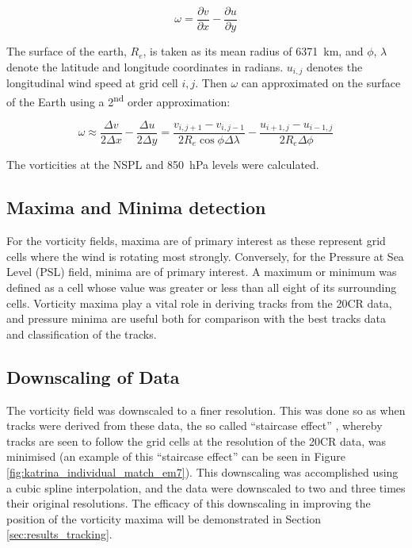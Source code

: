 \documentclass[pdftex,12pt,a4paper]{report}
\newcommand{\ts}{\textsuperscript}
\begin{document}
\begin{equation}
    \omega = \frac{\partial v}{\partial x} - \frac{\partial u}{\partial y}
    \label{eqn:vorticity}
\end{equation}

The surface of the earth, $R_e$, is taken as its mean radius of \SI{6371}{km}, and $\phi$, $\lambda$
denote the latitude and longitude coordinates in radians. $u_{i, j}$ denotes the longitudinal wind
speed at grid cell $i, j$. Then $\omega$ can approximated on the surface of the Earth using a
2\ts{nd} order approximation: %


\begin{equation}
    \omega \approx \frac{\Delta v}{2 \Delta x} - \frac{\Delta u}{2 \Delta y} = \frac{v_{i,j+1} - v_{i,j-1}}{2 R_e \cos{\phi} \Delta \lambda} - \frac{u_{i+1,j} - u_{i-1,j}}{2 R_e \Delta \phi }
    \label{eqn:vorticity_2nd_order}
\end{equation}

The vorticities at the NSPL and \SI{850}{hPa} levels were calculated.

\subsection{Maxima and Minima detection}
\label{sec:methods_maxima_minima}

For the vorticity fields, maxima are of primary interest as these represent grid cells where the
wind is rotating most strongly. Conversely, for the Pressure at Sea Level (PSL) field, minima are of
primary interest. A maximum or minimum was defined as a cell whose value was greater or less than
all eight of its surrounding cells. Vorticity maxima play a vital role in deriving tracks from the
20CR data, and pressure minima are useful both for comparison with the best tracks data and
classification of the tracks.

\subsection{Downscaling of Data}

The vorticity field was downscaled to a finer resolution. This was done so as when tracks were
derived from these data, the so called ``staircase effect'' \parencite{hodges1994general}, whereby
tracks are seen to follow the grid cells at the resolution of the 20CR data, was minimised (an
example of this ``staircase effect'' can be seen in Figure \ref{fig:katrina_individual_match_em7}).
This downscaling was accomplished using a cubic spline interpolation, and the data were downscaled
to two and three times their original resolutions. The efficacy of this downscaling in improving the
position of the vorticity maxima will be demonstrated in Section \ref{sec:results_tracking}.
\end{document}
